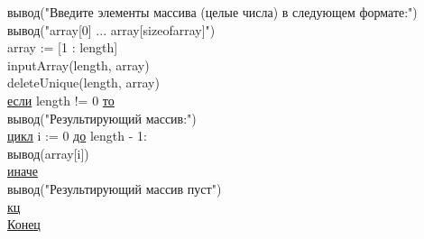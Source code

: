 \noindent
\null\qquad вывод("Введите элементы массива (целые числа) в следующем формате:")\\
\null\qquad вывод("array[0] ... array[sizeofarray]")\\

\noindent
\null\qquad array := [1 : length]\\
\null\qquad inputArray(length, array)\\
\null\qquad deleteUnique(length, array)\\

\noindent
\null\qquad \underline{если} length != 0 \underline{то}\\
\null\qquad \null\qquad вывод("Результирующий массив:")\\
\null\qquad \null\qquad \underline{цикл} i := 0 \underline{до} length - 1:\\
\null\qquad \null\qquad \null\qquad вывод(array[i])\\
\null\qquad \underline{иначе}\\
\null\qquad \null\qquad вывод("Результирующий массив пуст")\\
\null\qquad \underline{кц}\\
\underline{Конец}\\
